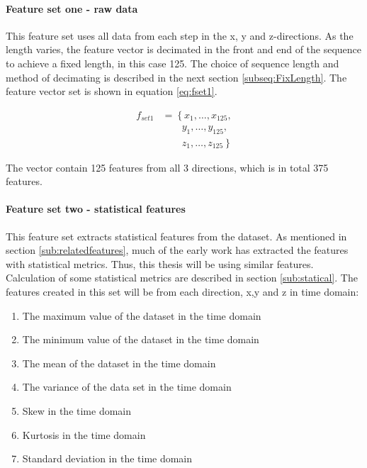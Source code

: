 \documentclass[USenglish]{ifimaster}  %
\begin{document}
\paragraph{Feature set one - raw data} 
This feature set uses all data from each step in the x, y and z-directions. As the length varies, the feature vector is decimated in the front and end of the sequence to achieve a fixed length, in this case 125.  The choice of sequence length and method of decimating is described in the next section \ref{subseq:FixLength}. The feature vector set is shown in equation \ref{eq:fset1}.
	

\begin{align}\label{eq:fset1}
f_{set1} &= \left\{ x_1,\dotsc,x_{125}, \right.\nonumber\\
&\qquad \left. {} y_1, \dotsc,y_{125}, \right.\nonumber\\
&\qquad \left. {} z_1,\dotsc,z_{125} \right\}
\end{align}

The vector contain 125 features from all 3 directions, which is in total 375 features.
	

		
		
	
\paragraph{Feature set two - statistical features} 
This feature set extracts statistical features from the dataset. As mentioned in section \ref{sub:relatedfeatures}, much of the early work has extracted the features with statistical metrics. Thus, this thesis will be using similar features. Calculation of some statistical metrics are described in section \ref{sub:statical}. The features created in this set will be from each direction, x,y and z in time domain: 
	
	
	\begin{enumerate}
		\item The maximum value of the dataset in the time domain
		\item The minimum value of the dataset in the time domain
		\item The mean of the dataset in the time domain
		\item The variance of the data set in the time domain
		\item Skew in the time domain
		\item Kurtosis in the time domain 
		\item Standard deviation in the time domain
	\end{enumerate}
	
\end{document}
